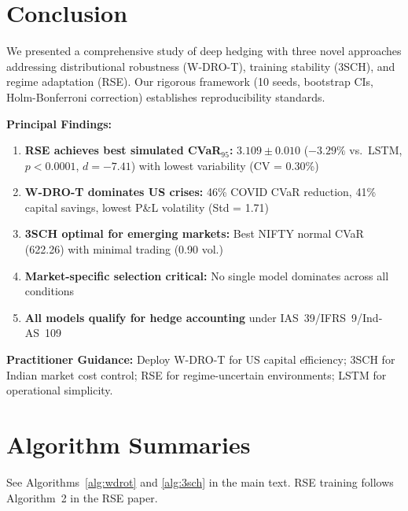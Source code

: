 \documentclass[11pt]{article}
\begin{document}
\section{Conclusion}
\label{sec:conclusion}

We presented a comprehensive study of deep hedging with three novel approaches addressing distributional robustness (W-DRO-T), training stability (3SCH), and regime adaptation (RSE). Our rigorous framework (10 seeds, bootstrap CIs, Holm-Bonferroni correction) establishes reproducibility standards.

\textbf{Principal Findings:}
\begin{enumerate}[noitemsep,leftmargin=*]
    \item \textbf{RSE achieves best simulated CVaR$_{95}$:} $3.109 \pm 0.010$ ($-3.29\%$ vs.\ LSTM, $p < 0.0001$, $d = -7.41$) with lowest variability (CV = 0.30\%)
    \item \textbf{W-DRO-T dominates US crises:} 46\% COVID CVaR reduction, 41\% capital savings, lowest P\&L volatility (Std = 1.71)
    \item \textbf{3SCH optimal for emerging markets:} Best NIFTY normal CVaR (622.26) with minimal trading (0.90 vol.)
    \item \textbf{Market-specific selection critical:} No single model dominates across all conditions
    \item \textbf{All models qualify for hedge accounting} under IAS~39/IFRS~9/Ind-AS~109
\end{enumerate}

\textbf{Practitioner Guidance:} Deploy W-DRO-T for US capital efficiency; 3SCH for Indian market cost control; RSE for regime-uncertain environments; LSTM for operational simplicity.




\appendix

\section{Algorithm Summaries}
\label{app:algorithms}

See Algorithms~\ref{alg:wdrot} and \ref{alg:3sch} in the main text. RSE training follows Algorithm~2 in the RSE paper.
\end{document}
